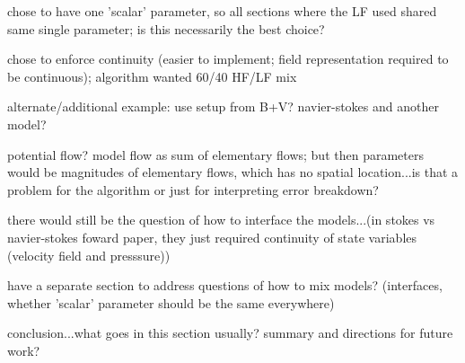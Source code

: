     \item chose to have one 'scalar' parameter, so all sections where the LF used shared same single parameter; is this necessarily the best choice?
    \item chose to enforce continuity (easier to implement; field representation required to be continuous); algorithm wanted 60/40 HF/LF mix
    \eit
  \item alternate/additional example: use setup from B+V? navier-stokes and another model? 
    \bit
    \item potential flow? model flow as sum of elementary flows; but then parameters would be magnitudes of elementary flows, which has no spatial location...is that a problem for the algorithm or just for interpreting error breakdown?
    \item there would still be the question of how to interface the models...(in stokes vs navier-stokes foward paper, they just required continuity of state variables (velocity field and presssure))
    \eit
  \item have a separate section to address questions of how to mix models? (interfaces, whether 'scalar' parameter should be the same everywhere)
  \eit
\item conclusion...what goes in this section usually? summary and directions for future work?
\eit
